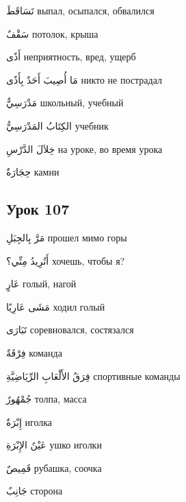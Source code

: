 \documentclass[a5paper]{article}
\newcommand\textstyleDropCaps[1]{#1}
\newcommand\textstyleCaptioncharacters[1]{#1}
\begin{document}
\textstyleCaptioncharacters{تَسَاقَطَ }\textstyleDropCaps{выпал, осыпался, обвалился‎}

\textstyleCaptioncharacters{سَقْفٌ }\textstyleDropCaps{потолок, крыша‎}

\textstyleCaptioncharacters{أَذًى }\textstyleDropCaps{неприятность, вред, ущерб‎}

\textstyleCaptioncharacters{مَا أُصِيبَ أَحَدٌ بِأَذًى }\textstyleDropCaps{никто не пострадал ‎}

\textstyleCaptioncharacters{مَدْرَسِيٌّ }\textstyleDropCaps{школьный, учеб­ный‎}

\textstyleCaptioncharacters{الكِتَابُ المَدْرَسِيُّ }\textstyleDropCaps{учеб­ник‎}

\textstyleCaptioncharacters{خِلاَلَ الدَّرْسِ }\textstyleDropCaps{на уроке, во время урока‎}

\textstyleCaptioncharacters{حِجَارَةٌ }\textstyleDropCaps{камни‎}

\subsection[Урок 107‎]{\textstyleDropCaps{Урок 107‎}}
\textstyleCaptioncharacters{مَرَّ بِالجِبَلِ }\textstyleDropCaps{прошел мимо горы‎}

\textstyleCaptioncharacters{أَتُرِيدُ مِنِّي؟ }\textstyleDropCaps{хочешь, чтобы я?‎}

\textstyleCaptioncharacters{عَارٍ }\textstyleDropCaps{голый, нагой‎}

\textstyleCaptioncharacters{مَشَى عَارِيًا }\textstyleDropCaps{ходил го­лый‎}

\textstyleCaptioncharacters{تَبَارَى }\textstyleDropCaps{соревновался, со­стязался‎}

\textstyleCaptioncharacters{فِرْقَةٌ }\textstyleDropCaps{команда‎}

\textstyleCaptioncharacters{فِرَقُ الأَلْعَابِ الرِّيَاضِيَّةِ }\textstyleDropCaps{спортивные команды ‎}

\textstyleCaptioncharacters{جُمْهُورٌ }\textstyleDropCaps{толпа, масса‎}

\textstyleCaptioncharacters{إِبْرَةٌ }\textstyleDropCaps{иголка‎}

\textstyleCaptioncharacters{عَيْنُ الإِبْرَةِ }\textstyleDropCaps{ушко иголки‎}

\textstyleCaptioncharacters{قَمِيصٌ }\textstyleDropCaps{рубашка, соочка‎}

\textstyleCaptioncharacters{جَانِبٌ }\textstyleDropCaps{сторона‎}
\end{document}
